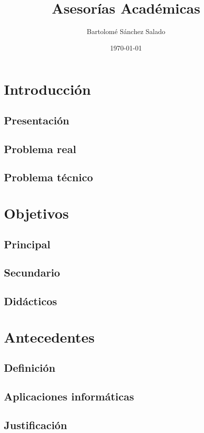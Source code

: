 \documentclass[a4paper,10pt,draft]{article}
\author{Bartolomé Sánchez Salado}
\title{Asesorías Académicas}
\date{\today}
\begin{document}
   \begin{titlepage}
      \maketitle
   \end{titlepage}

   \tableofcontents
   \newpage

   \section{Introducción}
      \subsection{Presentación}
      \subsection{Problema real}
      \subsection{Problema técnico}

   \section{Objetivos}
      \subsection{Principal}
      \subsection{Secundario}
      \subsection{Didácticos}

   \section{Antecedentes}
      \subsection{Definición}
      \subsection{Aplicaciones informáticas}
      \subsection{Justificación}
\end{document}
